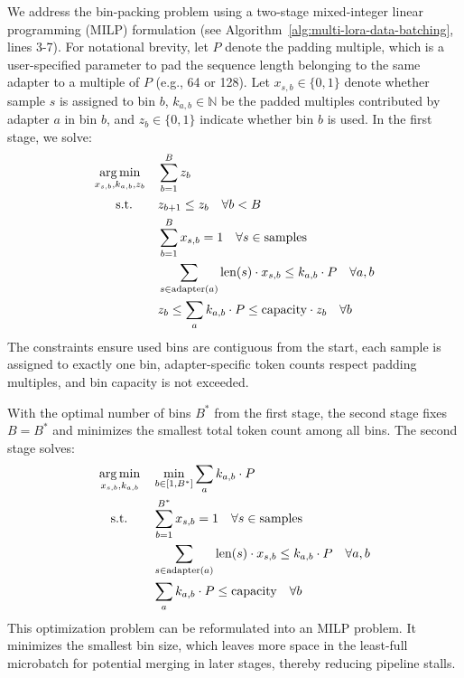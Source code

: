 We address the bin-packing problem using a two-stage mixed-integer linear programming (MILP) formulation (see Algorithm~\ref{alg:multi-lora-data-batching}, lines 3-7).
For notational brevity, let $P$ denote the padding multiple, which is a user-specified parameter to pad the sequence length belonging to the same adapter to a multiple of $P$ (e.g., 64 or 128). Let $x_{s,b} \in \{0,1\}$ denote whether sample $s$ is assigned to bin $b$, $k_{a,b} \in \mathbb{N}$ be the padded multiples contributed by adapter $a$ in bin $b$, and $z_b \in \{0,1\}$ indicate whether bin $b$ is used.  In the first stage, we solve:
\begin{equation}
\begin{aligned}
    \operatorname*{arg\,min}_{x_{s,b}, k_{a,b}, z_b} & \quad \sum_{b=1}^B z_b \\
    \text{s.t.} \quad & \quad z_{b+1} \leq z_b \quad \forall b < B \\
    &\quad \sum_{b=1}^B x_{s,b} = 1 \quad \forall s \in \text{samples} \\
    &\quad \sum_{s \in \text{adapter}(a)} \text{len}(s) \cdot x_{s,b} \leq k_{a,b} \cdot P \quad \forall a,b \\
    &\quad  z_b \leq \sum_{a} k_{a,b} \cdot P \leq \text{capacity} \cdot z_b \quad \forall b
\end{aligned}
\end{equation}
The constraints ensure used bins are contiguous from the start, each sample is assigned to exactly one bin, adapter-specific token counts respect padding multiples, and bin capacity is not exceeded.

With the optimal number of bins $B^{*}$ from the first stage, the second stage fixes $B = B^{*}$ and minimizes the smallest total token count among all bins. The second stage solves:
\begin{equation}
\begin{aligned}
    \operatorname*{arg\,min}_{x_{s,b}, k_{a,b}} & \quad \min_{b \in [1, B^*]} \sum_{a} k_{a,b} \cdot P \\
    \text{s.t.} \quad & \quad \sum_{b=1}^{B^*} x_{s,b} = 1 \quad \forall s \in \text{samples} \\
    &\quad \sum_{s \in \text{adapter}(a)} \text{len}(s) \cdot x_{s,b} \leq k_{a,b} \cdot P \quad \forall a,b \\
    &\quad \sum_{a} k_{a,b} \cdot P \leq \text{capacity} \quad \forall b \\
\end{aligned}
\end{equation}
This optimization problem can be reformulated into an MILP problem. It minimizes the smallest bin size, which leaves more space in the least-full microbatch for potential merging in later stages, thereby reducing pipeline stalls. 

